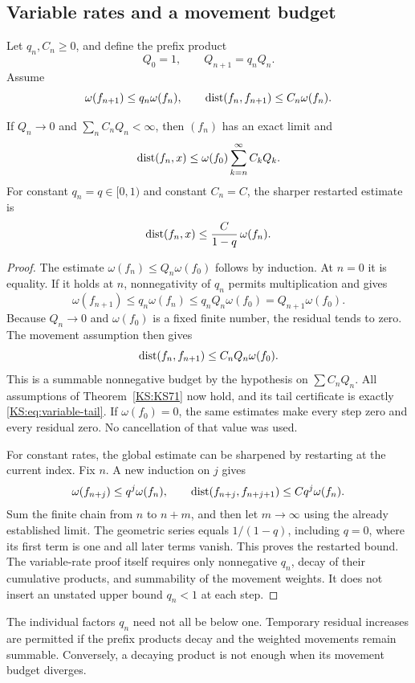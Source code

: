 \subsection{Variable rates and a movement budget}
Let \(q_n,C_n\ge0\), and define the prefix product
\[
 Q_0=1,\qquad Q_{n+1}=q_nQ_n.
\]
Assume
\begin{equation}\label{KS:eq:variable-rate}
 \omega(f_{n+1})\le q_n\omega(f_n),\qquad
 \operatorname{dist}(f_n,f_{n+1})\le C_n\omega(f_n).
\end{equation}

\begin{KStheorem}\label{KS:KS72}
If \(Q_n\to0\) and \(\sum_n C_nQ_n<\infty\), then \((f_n)\) has an exact limit and
\begin{equation}\label{KS:eq:variable-tail}
 \operatorname{dist}(f_n,x)\le\omega(f_0)\sum_{k=n}^{\infty}C_kQ_k.
\end{equation}
For constant \(q_n=q\in[0,1)\) and constant \(C_n=C\), the sharper restarted estimate is
\[
 \operatorname{dist}(f_n,x)\le\frac{C}{1-q}\,\omega(f_n).
\]
\end{KStheorem}
\begin{proof}
The estimate \(\omega(f_n)\le Q_n\omega(f_0)\) follows by induction. At \(n=0\) it is equality. If it holds at \(n\), nonnegativity of \(q_n\) permits multiplication and gives
\[
 \omega(f_{n+1})\le q_n\omega(f_n)
 \le q_nQ_n\omega(f_0)=Q_{n+1}\omega(f_0).
\]
Because \(Q_n\to0\) and \(\omega(f_0)\) is a fixed finite number, the residual tends to zero. The movement assumption then gives
\[
 \operatorname{dist}(f_n,f_{n+1})\le C_nQ_n\omega(f_0).
\]
This is a summable nonnegative budget by the hypothesis on \(\sum C_nQ_n\). All assumptions of Theorem~\ref{KS:KS71} now hold, and its tail certificate is exactly \eqref{KS:eq:variable-tail}. If \(\omega(f_0)=0\), the same estimates make every step zero and every residual zero. No cancellation of that value was used.

For constant rates, the global estimate can be sharpened by restarting at the current index. Fix \(n\). A new induction on \(j\) gives
\[
 \omega(f_{n+j})\le q^j\omega(f_n),\qquad
 \operatorname{dist}(f_{n+j},f_{n+j+1})\le Cq^j\omega(f_n).
\]
Sum the finite chain from \(n\) to \(n+m\), and then let \(m\to\infty\) using the already established limit. The geometric series equals \(1/(1-q)\), including \(q=0\), where its first term is one and all later terms vanish. This proves the restarted bound. The variable-rate proof itself requires only nonnegative \(q_n\), decay of their cumulative products, and summability of the movement weights. It does not insert an unstated upper bound \(q_n<1\) at each step.
\end{proof}
The individual factors \(q_n\) need not all be below one. Temporary residual increases are permitted if the prefix products decay and the weighted movements remain summable. Conversely, a decaying product is not enough when its movement budget diverges.

